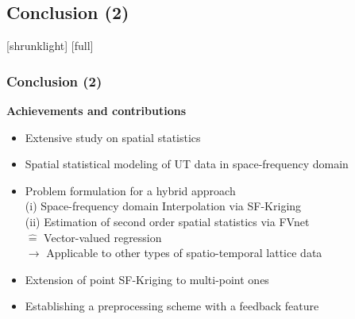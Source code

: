 \documentclass[11pt,compress,aspectratio=169]{beamer} %
\begin{document}
\subsection{Conclusion (2)}
[shrunklight]
[full]
\begin{frame}[t]
	\frametitle{Conclusion (2)}
	\textbf{Achievements and contributions}
	\begin{itemize}
		\item Extensive study on spatial statistics
		\item Spatial statistical modeling of UT data in space-frequency domain
		\item Problem formulation for a hybrid approach\\
		(i) Space-frequency domain Interpolation via SF-Kriging\\
		(ii) Estimation of second order spatial statistics via FVnet\\
		\hspace*{0.5cm} $\hat{=}$ Vector-valued regression\\ 
		\hspace*{0.5cm} $\rightarrow$ Applicable to other types of spatio-temporal lattice data\\
		\item Extension of point SF-Kriging to multi-point ones
		\item Establishing a preprocessing scheme with a feedback feature
	\end{itemize}
\end{frame}
\end{document}
